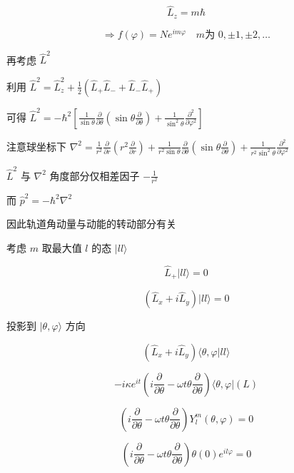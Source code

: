 \documentclass[lang=cn,10pt]{elegantbook}
\begin{document}
\[
\hat{L}_z = m\hbar
\]

\[
\Rightarrow f(\varphi) = N e^{im\varphi} \quad m \text{为 } 0, \pm1, \pm2, \ldots
\]

再考虑 $\hat{L}^2$

利用 $\hat{L}^2 = \hat{L}_z^2 + \frac{1}{2}(\hat{L}_+ \hat{L}_- + \hat{L}_- \hat{L}_+)$

可得 $\hat{L}^2 = -\hbar^2 \left[ \frac{1}{\sin\theta} \frac{\partial}{\partial \theta} \left( \sin\theta \frac{\partial}{\partial \theta} \right) + \frac{1}{\sin^2\theta} \frac{\partial^2}{\partial \varphi^2} \right]$

注意球坐标下 $\nabla^2 = \frac{1}{r^2} \frac{\partial}{\partial r} \left( r^2 \frac{\partial}{\partial r} \right) + \frac{1}{r^2 \sin\theta} \frac{\partial}{\partial \theta} \left( \sin\theta \frac{\partial}{\partial \theta} \right) + \frac{1}{r^2 \sin^2\theta} \frac{\partial^2}{\partial \varphi^2}$

$\hat{L}^2$ 与 $\nabla^2$ 角度部分仅相差因子 $-\frac{1}{r^2}$

而 $\hat{p}^2 = -\hbar^2 \nabla^2$

因此轨道角动量与动能的转动部分有关

考虑 $m$ 取最大值 $l$ 的态 $|l l \rangle$

\begin{equation}
	\hat{L}_+ |l l\rangle = 0
\end{equation}

\begin{equation}
	(\hat{L}_x + i\hat{L}_y) |l l\rangle = 0
\end{equation}

投影到 $|\theta, \varphi\rangle$ 方向

\begin{equation}
	(\hat{L}_x + i\hat{L}_y) \langle \theta, \varphi | l l \rangle
\end{equation}

\begin{equation}
	-i\kappa e^{it}\left(i\frac{\partial}{\partial \theta} - \omega t \theta \frac{\partial}{\partial \theta}\right) \langle \theta, \varphi | (L)
\end{equation}

\begin{equation}
	\left(i\frac{\partial}{\partial \theta} - \omega t \theta \frac{\partial}{\partial \theta}\right) Y_{l}^{m}(\theta, \varphi) = 0
\end{equation}

\begin{equation}
	\left(i\frac{\partial}{\partial \theta} - \omega t \theta \frac{\partial}{\partial \theta}\right) \theta(0) e^{il\varphi} = 0
\end{equation}
\end{document}
